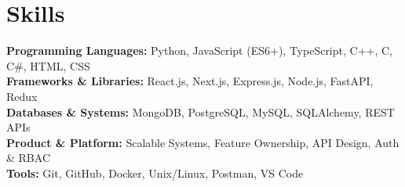 
\vspace{-15pt}

\section*{Skills}
\textbf{Programming Languages:} Python, JavaScript (ES6+), TypeScript, C++, C, C\#, HTML, CSS \\
\textbf{Frameworks \& Libraries:} React.js, Next.js, Express.js, Node.js, FastAPI, Redux \\
\textbf{Databases \& Systems:} MongoDB, PostgreSQL, MySQL, SQLAlchemy, REST APIs \\
\textbf{Product \& Platform:} Scalable Systems, Feature Ownership, API Design, Auth \& RBAC \\
\textbf{Tools:} Git, GitHub, Docker, Unix/Linux, Postman, VS Code